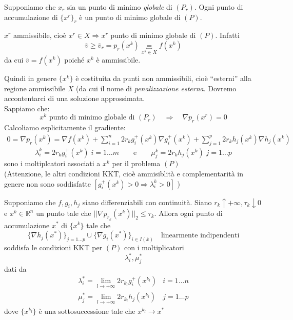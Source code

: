 \begin{proposition}
  Supponiamo che $x_r$ sia un punto di minimo
 \emph{globale} di $(P_r)$.
Ogni punto di accumulazione di $\{x^r\}_r$ \`e
un punto di minimo globale di $(P)$.
\end{proposition}
\begin{observation}
$x^{r}$ ammissibile, cio\`e $x^{r} \in X \Rightarrow x^{r}$ punto
di minimo globale di $(P)$. Infatti
$$ \overline{v} \geq \overline{v}_{r} = p_{r}(x^k) 
\underbracket{=}_{x^{k} \in X}  f(x^{k})$$ da cui
$\overline{v} = f(x^{k})$ poich\'e $x^{k}$ \`e ammissibile.
\end{observation}
Quindi in genere $\{x^{k} \}$ \`e costituita da punti
non ammissibili, cio\`e ``esterni'' alla regione
ammissibile $X$ (da cui il nome di \emph{penalizzazione esterna}.
Dovremo accontentarci di una soluzione approssimata.\\
Sappiamo che:
$$ x^{k} \text{ punto di minimo globale di } (P_r) \quad
\Rightarrow \quad \nabla p_r(x^{r}) = 0 $$
Calcoliamo esplicitamente il gradiente:
$$
\begin{array}{l}
0 =  \nabla p_r(x^{k}) = 
\nabla f(x^{k}) +
\displaystyle \sum_{i=1}^{n} 2r_k g_i^{+}(x^{k})
\nabla g_i^{+}(x^{k}) + \displaystyle \sum_{j=1}^{p} 2r_k h_j(x^{k})
\nabla h_j(x^{k})
\end{array}
$$
$$ \lambda_i^{k} =  2r_{k}g_i^{+}(x^{k}) \; i=1\ldots m
\qquad  \text{e} \qquad
\mu_j^{k} = 2r_{k}h_j(x^k) \; j=1\ldots p$$
 sono i moltiplcatori associati
a $x^{k}$ per il problema $(P)$ \\
 (Attenzione, le altri condizioni
KKT, cio\`e ammisiblit\`a e complementarit\`a in genere
non sono soddisfatte $[g_i^{+}(x^{k}) > 0 \Rightarrow \lambda_i^{k} > 0 ]$
)
\begin{theo}
Supponiamo che $f, g_i, h_j$ siano differenziabili
con continuit\`a. Siano
$r_k \uparrow + \infty, \tau_k \downarrow 0$ e
$x^{k} \in \mathbb{R}^{n}$ un punto tale che
$||\nabla p_{r_k}(x^{k})||_{2} \leq \tau_k$.
Allora ogni punto di accumulazione $x^{*}$ di
$\{x^{k}\}$ tale che
$$
\{ \nabla h_j(x^{*}) \}_{j=1\ldots p}  \cup
\{ \nabla g_i(x^{*}) \}_{i \in I(\overline{x})}
\quad \text{linearmente indipendenti}
$$
soddisfa le condizioni
KKT per $(P)$ con i moltiplicatori
$$ \lambda_i^{*}, \mu_j^{*}$$
dati da
$$
\begin{array}{ll}
\displaystyle \lambda_i^{*} = \lim_{l \to + \infty}
2r_{{k}_l} g^{+}_i(x^{k_l})  &  i =1 \ldots n \\
\displaystyle \mu_{j}^{*} = \lim_{l \to + \infty} 2r_{k_{l}}
h_j(x^{k_l}) & j =1 \ldots p
\end{array}
 $$
dove $\{x^{k_l}\}$ \`e una sottosuccessione tale che
$x^{k_l} \rightarrow x^{*} $
\end{theo}

